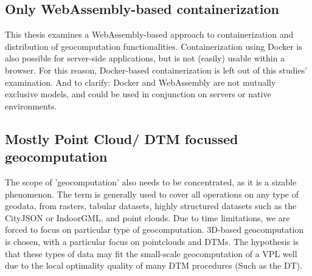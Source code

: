 

\subsection*{Only WebAssembly-based containerization}

This thesis examines a WebAssembly-based approach to containerization and distribution of geocomputation functionalities. 
Containerization using Docker is also possible for server-side applications, but is not (easily) usable within a browser. 
For this reason, Docker-based containerization is left out of this studies' examination. 
And to clarify: Docker and WebAssembly are not mutually exclusive models, and could be used in conjunction on servers or native environments. 

\subsection*{Mostly Point Cloud/ DTM focussed geocomputation}

The scope of 'geocomputation' also needs to be concentrated, as it is a sizable phenomenon.
The term is generally used to cover all operations on any type of geodata, from rasters, tabular datasets, highly structured datasets such as the CityJSON or IndoorGML, and point clouds. 
Due to time limitations, we are forced to focus on particular type of geocomputation.
3D-based geocomputation is chosen, with a particular focus on pointclouds and DTMs. 
The hypothesis is that these types of data may fit the small-scale geocomputation of a VPL well due to the local optimality quality of many DTM procedures (Such as the \ac{DT}). 



